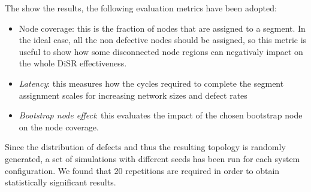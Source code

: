 The show the results, the following evaluation metrics have been adopted:
\begin{itemize}
\item{Node coverage}: this is the fraction of nodes that
are assigned to a segment. In the ideal case, all the non defective
nodes should be assigned, so this metric is useful to show how some
disconnected node regions can negativaly impact on the whole DiSR
effectiveness.
\item{\emph{Latency}}: this measures how the cycles required to complete the
segment assignment scales for increasing network sizes and defect rates
\item{\emph{Bootstrap node effect}}: this evaluates the impact of the chosen
bootstrap node on the node coverage.
\end{itemize}


Since the distribution of defects and thus the resulting topology is randomly
generated, a set of simulations with different seeds has been run
for each system configuration. We found that 20 repetitions are
required in order to obtain statistically significant results.

